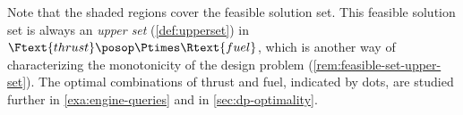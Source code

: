 \begin{example}
    Note that the shaded regions cover the feasible solution set.
    This feasible solution set is always an \emph{upper set} (\cref{def:upperset}) in $\Ftext{thrust}\posop \Ptimes \Rtext{fuel}$, which is another way of characterizing the monotonicity of the design problem (\cref{rem:feasible-set-upper-set}).
    The optimal combinations of thrust and fuel, indicated by dots, are studied further in \cref{exa:engine-queries} and in \cref{sec:dp-optimality}.

\end{example}


    

%
%
%
